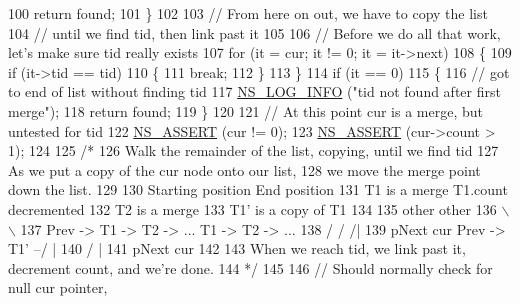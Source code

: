 \begin{DoxyCode}
100       \textcolor{keywordflow}{return} found;
101     \}
102 
103   \textcolor{comment}{// From here on out, we have to copy the list}
104   \textcolor{comment}{// until we find tid, then link past it}
105 
106   \textcolor{comment}{// Before we do all that work, let's make sure tid really exists}
107   \textcolor{keywordflow}{for} (it = cur; it != 0; it = it->next)
108     \{
109       \textcolor{keywordflow}{if} (it->tid == tid)
110         \{
111           \textcolor{keywordflow}{break};
112         \}
113     \}
114   \textcolor{keywordflow}{if} (it == 0)
115     \{
116       \textcolor{comment}{// got to end of list without finding tid}
117       \hyperlink{group__logging_gafbd73ee2cf9f26b319f49086d8e860fb}{NS\_LOG\_INFO} (\textcolor{stringliteral}{"tid not found after first merge"});
118       \textcolor{keywordflow}{return} found;
119     \}
120 
121   \textcolor{comment}{// At this point cur is a merge, but untested for tid}
122   \hyperlink{assert_8h_a6dccdb0de9b252f60088ce281c49d052}{NS\_ASSERT} (cur != 0);
123   \hyperlink{assert_8h_a6dccdb0de9b252f60088ce281c49d052}{NS\_ASSERT} (cur->count > 1);
124 
125   \textcolor{comment}{/*}
126 \textcolor{comment}{     Walk the remainder of the list, copying, until we find tid}
127 \textcolor{comment}{     As we put a copy of the cur node onto our list,}
128 \textcolor{comment}{     we move the merge point down the list.}
129 \textcolor{comment}{}
130 \textcolor{comment}{     Starting position                  End position}
131 \textcolor{comment}{       T1 is a merge                     T1.count decremented}
132 \textcolor{comment}{                                         T2 is a merge}
133 \textcolor{comment}{                                         T1' is a copy of T1}
134 \textcolor{comment}{}
135 \textcolor{comment}{          other                             other}
136 \textcolor{comment}{               \(\backslash\)                                 \(\backslash\)}
137 \textcolor{comment}{      Prev  ->  T1  ->  T2  -> ...                T1  ->  T2  -> ...}
138 \textcolor{comment}{           /   /                                         /|}
139 \textcolor{comment}{      pNext cur                         Prev  ->  T1' --/ |}
140 \textcolor{comment}{                                                     /    |}
141 \textcolor{comment}{                                                pNext   cur}
142 \textcolor{comment}{}
143 \textcolor{comment}{     When we reach tid, we link past it, decrement count, and we're done.}
144 \textcolor{comment}{  */}
145 
146   \textcolor{comment}{// Should normally check for null cur pointer,}

\end{DoxyCode}

